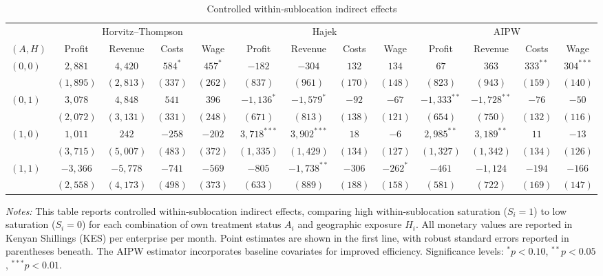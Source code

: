 \documentclass{article}
\begin{document}
\begin{table}[H]
\centering
\caption{Controlled within-sublocation indirect effects}
\label{tab:within_indirect}
\footnotesize
\begin{tabular}{lcccccccccccc}
\toprule
& \multicolumn{4}{c}{Horvitz--Thompson} & \multicolumn{4}{c}{Hajek} & \multicolumn{4}{c}{AIPW} \\
\cmidrule(lr){2-5} \cmidrule(lr){6-9} \cmidrule(lr){10-13}
$(A,H)$ & Profit & Revenue & Costs & Wage & Profit & Revenue & Costs & Wage & Profit & Revenue & Costs & Wage \\
\midrule
$(0,0)$ & $2{,}881$ & $4{,}420$ & $584^{*}$ & $457^{*}$ & $-182$ & $-304$ & $132$ & $134$ & $67$ & $363$ & $333^{**}$ & $304^{***}$ \\
        & $(1{,}895)$ & $(2{,}813)$ & $(337)$ & $(262)$ & $(837)$ & $(961)$ & $(170)$ & $(148)$ & $(823)$ & $(943)$ & $(159)$ & $(140)$ \\
\addlinespace
$(0,1)$ & $3{,}078$ & $4{,}848$ & $541$ & $396$ & $-1{,}136^{*}$ & $-1{,}579^{*}$ & $-92$ & $-67$ & $-1{,}333^{**}$ & $-1{,}728^{**}$ & $-76$ & $-50$ \\
        & $(2{,}072)$ & $(3{,}131)$ & $(331)$ & $(248)$ & $(671)$ & $(813)$ & $(138)$ & $(121)$ & $(654)$ & $(750)$ & $(132)$ & $(116)$ \\
\addlinespace
$(1,0)$ & $1{,}011$ & $242$ & $-258$ & $-202$ & $3{,}718^{***}$ & $3{,}902^{***}$ & $18$ & $-6$ & $2{,}985^{**}$ & $3{,}189^{**}$ & $11$ & $-13$ \\
        & $(3{,}715)$ & $(5{,}007)$ & $(483)$ & $(372)$ & $(1{,}335)$ & $(1{,}429)$ & $(134)$ & $(127)$ & $(1{,}327)$ & $(1{,}342)$ & $(134)$ & $(126)$ \\
\addlinespace
$(1,1)$ & $-3{,}366$ & $-5{,}778$ & $-741$ & $-569$ & $-805$ & $-1{,}738^{**}$ & $-306$ & $-262^{*}$ & $-461$ & $-1{,}124$ & $-194$ & $-166$ \\
        & $(2{,}558)$ & $(4{,}173)$ & $(498)$ & $(373)$ & $(633)$ & $(889)$ & $(188)$ & $(158)$ & $(581)$ & $(722)$ & $(169)$ & $(147)$ \\
\bottomrule
\end{tabular}
\begin{minipage}{0.95\textwidth}
\vspace{2mm}
\footnotesize
\textit{Notes:} This table reports controlled within-sublocation indirect effects, comparing high within-sublocation saturation ($S_i=1$) to low saturation ($S_i=0$) for each combination of own treatment status $A_i$ and geographic exposure $H_i$. All monetary values are reported in Kenyan Shillings (KES) per enterprise per month. Point estimates are shown in the first line, with robust standard errors reported in parentheses beneath. The AIPW estimator incorporates baseline covariates for improved efficiency. Significance levels: $^{*}p<0.10$, $^{**}p<0.05$, $^{***}p<0.01$.
\end{minipage}
\end{table}
\end{document}
